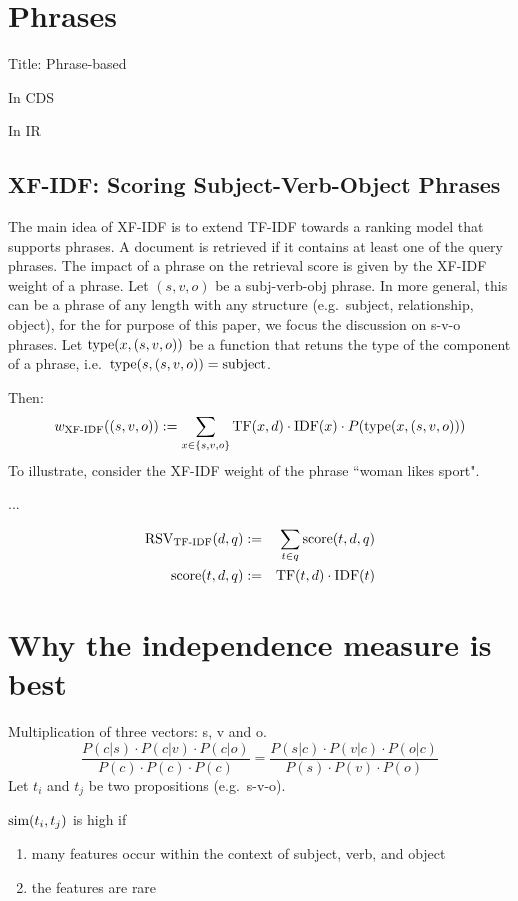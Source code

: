 \section{Phrases}

Title: Phrase-based


In CDS


In IR


\subsection{XF-IDF: Scoring Subject-Verb-Object Phrases}

The main idea of XF-IDF \cite{Azzam/etal:SIGMOD:KEYS:2010} is to extend
TF-IDF towards a ranking model that supports phrases.
%
A document is retrieved if it contains at least one of the query phrases.
%
The impact of a phrase on the retrieval score is given by the XF-IDF
weight of a phrase.
%
Let $(s,v,o)$ be a subj-verb-obj phrase.
In more general, this can be a phrase of any length with any structure
(e.g.~subject, relationship, object), for the for purpose of this paper,
we focus the discussion on s-v-o phrases.
%
Let $\textmd{type}(x,(s,v,o))$ be a function that retuns the type of the component
of a phrase, i.e.~$\textmd{type}(s,(s,v,o))=\textmd{subject}$.

Then:
\[
w_\textmd{XF-IDF}((s,v,o)) :=
\sum_{x \in \{s,v,o\}} \textmd{TF}(x,d) \cdot \textmd{IDF}(x) \cdot P(\textmd{type}(x,(s,v,o)))
\]
To illustrate, consider the XF-IDF weight of the phrase ``woman likes sport".

...

\begin{eqnarray}
\label{tf-idf-phrase}
\textmd{RSV}_\textmd{TF-IDF}(d,q) &:=& \sum_{t \in q} \textmd{score}(t,d,q)\\
\textmd{score}(t,d,q) &:=&
\textmd{TF}(t,d) \cdot \textmd{IDF}(t)
\end{eqnarray}





\section{Why the independence measure is best}

Multiplication of three vectors: s, v and o.
\[
\frac{
P(c|s) \cdot P(c|v) \cdot P(c|o)}{
P(c) \cdot P(c) \cdot P(c)} =
\frac{
P(s|c) \cdot P(v|c) \cdot P(o|c)
}{
P(s) \cdot P(v) \cdot P(o)
}
\]
Let $t_i$ and $t_j$ be two propositions
(e.g.~s-v-o).

$\textmd{sim}(t_i,t_j)$ is high if
\begin{enumerate}
\item many features occur within the context of subject, verb, and object
\item the features are rare
\end{enumerate}

